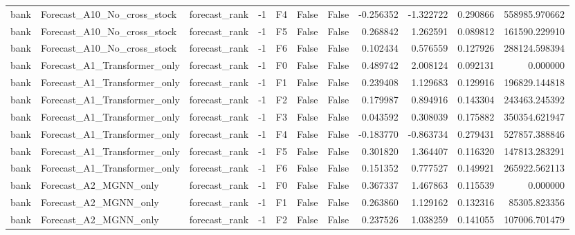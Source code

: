 \begin{tabular}{lllrlllrrrr}
      bank &  Forecast\_A10\_No\_cross\_stock & forecast\_rank &    -1 &  F4 &           False &            False & -0.256352 & -1.322722 & 0.290866 &    558985.970662 \\
      bank &  Forecast\_A10\_No\_cross\_stock & forecast\_rank &    -1 &  F5 &           False &            False &  0.268842 &  1.262591 & 0.089812 &    161590.229910 \\
      bank &  Forecast\_A10\_No\_cross\_stock & forecast\_rank &    -1 &  F6 &           False &            False &  0.102434 &  0.576559 & 0.127926 &    288124.598394 \\
      bank & Forecast\_A1\_Transformer\_only & forecast\_rank &    -1 &  F0 &           False &            False &  0.489742 &  2.008124 & 0.092131 &         0.000000 \\
      bank & Forecast\_A1\_Transformer\_only & forecast\_rank &    -1 &  F1 &           False &            False &  0.239408 &  1.129683 & 0.129916 &    196829.144818 \\
      bank & Forecast\_A1\_Transformer\_only & forecast\_rank &    -1 &  F2 &           False &            False &  0.179987 &  0.894916 & 0.143304 &    243463.245392 \\
      bank & Forecast\_A1\_Transformer\_only & forecast\_rank &    -1 &  F3 &           False &            False &  0.043592 &  0.308039 & 0.175882 &    350354.621947 \\
      bank & Forecast\_A1\_Transformer\_only & forecast\_rank &    -1 &  F4 &           False &            False & -0.183770 & -0.863734 & 0.279431 &    527857.388846 \\
      bank & Forecast\_A1\_Transformer\_only & forecast\_rank &    -1 &  F5 &           False &            False &  0.301820 &  1.364407 & 0.116320 &    147813.283291 \\
      bank & Forecast\_A1\_Transformer\_only & forecast\_rank &    -1 &  F6 &           False &            False &  0.151352 &  0.777527 & 0.149921 &    265922.562113 \\
      bank &        Forecast\_A2\_MGNN\_only & forecast\_rank &    -1 &  F0 &           False &            False &  0.367337 &  1.467863 & 0.115539 &         0.000000 \\
      bank &        Forecast\_A2\_MGNN\_only & forecast\_rank &    -1 &  F1 &           False &            False &  0.263860 &  1.129162 & 0.132316 &     85305.823356 \\
      bank &        Forecast\_A2\_MGNN\_only & forecast\_rank &    -1 &  F2 &           False &            False &  0.237526 &  1.038259 & 0.141055 &    107006.701479 \\

\end{tabular}
